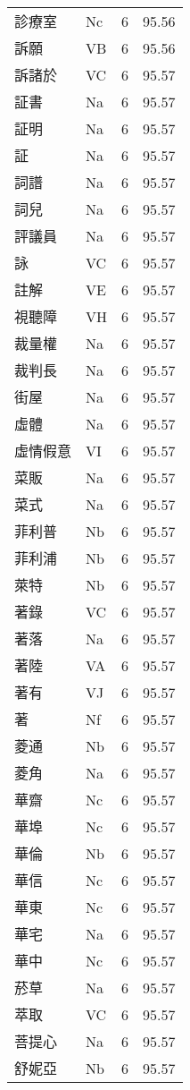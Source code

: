\documentclass[twocolumn]{book}
\begin{document}
\begin{supertabular}{llrr}
診療室 & Nc & 6 &  95.56\\
訴願 & VB & 6 &  95.56\\
訴諸於 & VC & 6 &  95.57\\
証書 & Na & 6 &  95.57\\
証明 & Na & 6 &  95.57\\
証 & Na & 6 &  95.57\\
詞譜 & Na & 6 &  95.57\\
詞兒 & Na & 6 &  95.57\\
評議員 & Na & 6 &  95.57\\
詠 & VC & 6 &  95.57\\
註解 & VE & 6 &  95.57\\
視聽障 & VH & 6 &  95.57\\
裁量權 & Na & 6 &  95.57\\
裁判長 & Na & 6 &  95.57\\
街屋 & Na & 6 &  95.57\\
虛體 & Na & 6 &  95.57\\
虛情假意 & VI & 6 &  95.57\\
菜販 & Na & 6 &  95.57\\
菜式 & Na & 6 &  95.57\\
菲利普 & Nb & 6 &  95.57\\
菲利浦 & Nb & 6 &  95.57\\
萊特 & Nb & 6 &  95.57\\
著錄 & VC & 6 &  95.57\\
著落 & Na & 6 &  95.57\\
著陸 & VA & 6 &  95.57\\
著有 & VJ & 6 &  95.57\\
著 & Nf & 6 &  95.57\\
菱通 & Nb & 6 &  95.57\\
菱角 & Na & 6 &  95.57\\
華齋 & Nc & 6 &  95.57\\
華埠 & Nc & 6 &  95.57\\
華倫 & Nb & 6 &  95.57\\
華信 & Nc & 6 &  95.57\\
華東 & Nc & 6 &  95.57\\
華宅 & Na & 6 &  95.57\\
華中 & Nc & 6 &  95.57\\
菸草 & Na & 6 &  95.57\\
萃取 & VC & 6 &  95.57\\
菩提心 & Na & 6 &  95.57\\
舒妮亞 & Nb & 6 &  95.57\\

\end{supertabular}
\end{document}
